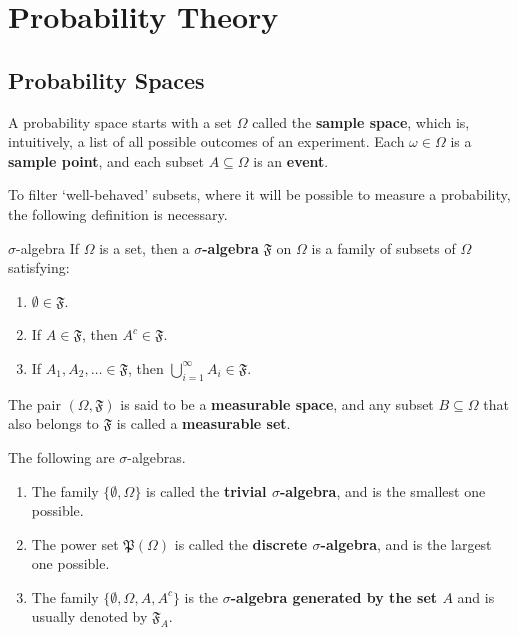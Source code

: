 \chapter{Probability Theory}

\section{Probability Spaces}

A probability space starts with a set $\Omega$ called the \textbf{sample space}, which is, intuitively, a list of all possible outcomes of an experiment. Each $\omega \in \Omega$ is a \textbf{sample point}, and each subset $A \subseteq \Omega$ is an \textbf{event}.

To filter `well-behaved' subsets, where it will be possible to measure a probability, the following definition is necessary.

\begin{definition}[]{$\sigma$-algebra}{}
	If $\Omega$ is a set, then a \textbf{$\sigma$-algebra} $\mathfrak{F}$ on $\Omega$ is a family of subsets of $\Omega$ satisfying:
	\begin{enumerate}
		\item $\emptyset \in \mathfrak{F}$.
		\item If $A \in \mathfrak{F}$, then $A^c \in \mathfrak{F}$.
		\item If $A_1, A_2, \ldots \in \mathfrak{F}$, then $\bigcup_{i=1}^\infty A_i \in \mathfrak{F}$.
	\end{enumerate}
	The pair $(\Omega, \mathfrak{F})$ is said to be a \textbf{measurable space}, and any subset $B \subseteq \Omega$ that also belongs to $\mathfrak{F}$ is called a \textbf{measurable set}.
\end{definition}

\begin{example}
	The following are $\sigma$-algebras.
	\begin{enumerate}
		\item The family $\{\emptyset, \Omega\}$ is called the \textbf{trivial $\sigma$-algebra}, and is the smallest one possible.
		\item The power set $\mathfrak{P}(\Omega)$ is called the \textbf{discrete $\sigma$-algebra}, and is the largest one possible.
		\item The family $\{\emptyset, \Omega, A, A^c\}$ is the \textbf{$\sigma$-algebra generated by the set $A$} and is usually denoted by $\mathfrak{F}_A$.
	\end{enumerate}
\end{example}

